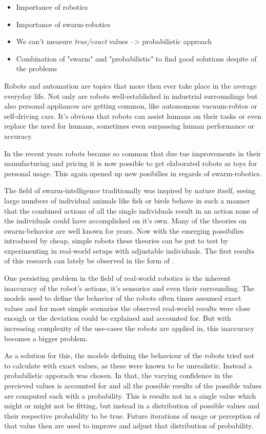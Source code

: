 \begin{itemize}
	\item{Importance of robotics}
	\item{Importance of swarm-robotics}
	\item{We can't measure \emph{true/exact} values --> probabilistic approach}
	\item{Combination of "swarm" and "probabilistic" to find good solutions despite of the problems}
\end{itemize}

Robots and automation are topics that more then ever take place in the average everyday life. Not only are robots well-established in industrial surroundings but also personal appliances are getting common, like autonomous vacuum-robtos or self-driving cars. It's obvious that robots can assist humans on their tasks or even replace the need for humans, sometimes even surpassing human performance or accuracy.

In the recent years robots became so common that due tue improvements in their manufacturing and pricing it is now possible to get elaborated robots as toys for personal usage. This again opened up new posibilies in regards of swarm-robotics.

The field of swarm-intelligence traditionally was inspired by nature itself, seeing large numbers of individual animals like fish or birds behave in such a manner that the combined actions of all the single individuals result in an action none of the individuals could have accomplished on it's own. Many of the theories on swarm-behavior are well known for years. Now with the emerging possibilies introduced by cheap, simple robots these theories can be put to test by experimenting in real-world setups with adjustable individuals. The first results of this research can lately be observed in the form of .

One persisting problem in the field of real-world robotics is the inherent inaccuracy of the robot's actions, it's sensorics and even their surrounding. The models used to define the behavior of the robots often times assumed exact values and for most simple scenarios the observed real-world results were close enough or the deviation could be explained and accounted for. But with increasing complexity of the use-cases the robots are applied in, this inaccuracy becomes a bigger problem.

As a solution for this, the models defining the behaviour of the robots tried not to calculate with exact values, as these were known to be unrealistic. Instead a probabilistic apporach was chosen. In that, the varying confidence in the percieved values is accounted for and all the possible results of the possible values are computed each with a probability. This is results not in a single value which might or might not be fitting, but instead in a distribution of possible values and their respective probability to be true. Future iterations of usage or perception of that value then are used to improve and adjust that distribution of probability.

